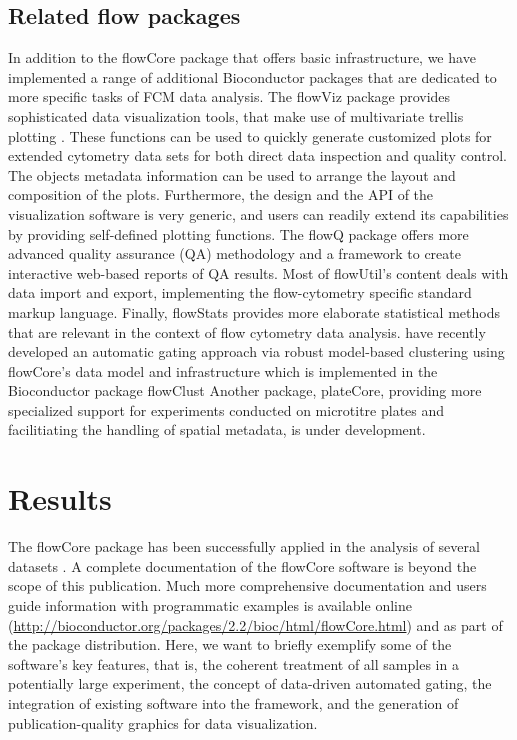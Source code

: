 \documentclass[12pt]{article}
\newcommand{\Rpackage}[1]{{\textsf{#1}}}
\begin{document}
\subsection*{Related flow packages}

In addition to the \Rpackage{flowCore} package that offers basic
infrastructure, we have implemented a range of additional Bioconductor
packages that are dedicated to more specific tasks of FCM data
analysis. The \Rpackage{flowViz} package \citep{sarkar2008ufv}
provides sophisticated data visualization tools, that make use of
multivariate trellis plotting \citep{lattice}.  These functions can be
used to quickly generate customized plots for extended cytometry data
sets for both direct data inspection and quality control.  The objects
metadata information can be used to arrange the layout and composition
of the plots.  Furthermore, the design and the API of the
visualization software is very generic, and users can readily extend
its capabilities by providing self-defined plotting functions.  The
\Rpackage{flowQ} package offers more advanced quality assurance (QA)
methodology and a framework to create interactive web-based reports of
QA results.  Most of \Rpackage{flowUtil}'s content deals with data
import and export, implementing the flow-cytometry specific standard
markup language.  Finally, \Rpackage{flowStats} provides more
elaborate statistical methods that are relevant in the context of flow
cytometry data analysis. \cite{lo2008agf} have recently developed an
automatic gating approach via robust model-based clustering using
\Rpackage{flowCore}'s data model and infrastructure which is
implemented in the Bioconductor package \Rpackage{flowClust} Another
package, \Rpackage{plateCore}, providing more specialized support for
experiments conducted on microtitre plates and facilitiating the
handling of spatial metadata, is under development.

\section*{Results}
The \Rpackage{flowCore} package has been successfully applied in the
analysis of several datasets
\citep{gasparetto2004ice,brinkman2007hcf}. A complete documentation of
the \Rpackage{flowCore} software is beyond the scope of this
publication.  Much more comprehensive documentation and users guide
information with programmatic examples is available online
(\url{http://bioconductor.org/packages/2.2/bioc/html/flowCore.html})
and as part of the package distribution. Here, we want to briefly
exemplify some of the software's key features, that is, the coherent
treatment of all samples in a potentially large experiment, the
concept of data-driven automated gating, the integration of existing
software into the framework, and the generation of publication-quality
graphics for data visualization.
\end{document}
